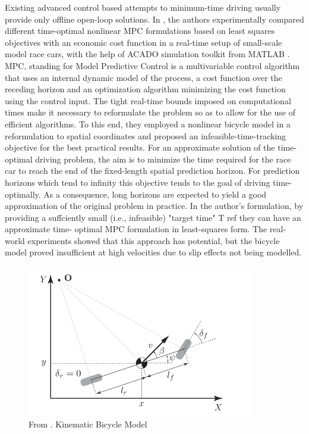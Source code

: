 Existing advanced control based attempts to minimum-time driving usually provide only offline open-loop solutions.
In \cite{mpc}, the authors experimentally compared different time-optimal nonlinear MPC \cite{mpc_orig} formulations based on least squares objectives with an economic cost function in a real-time setup of small-scale model race cars, with the help of ACADO simulation toolkit from MATLAB \cite{acado}.
MPC, standing for Model Predictive Control is a multivariable control algorithm that uses an internal dynamic model of the process, a cost function over the receding horizon and an optimization algorithm minimizing the cost function using the control input.
The tight real-time bounds imposed on computational times make it necessary to reformulate the problem so as to allow for the use of efficient algorithms. To this end, they employed a nonlinear bicycle model \cite{bycicle} in a reformulation to spatial coordinates and proposed an infeasible-time-tracking objective for the best practical results.
For an approximate solution of the time-optimal driving problem, the aim is to minimize the time required for the race car to reach the end of the fixed-length spatial prediction horizon. For prediction horizons which tend to infinity this objective tends to the goal of driving time-optimally. As a consequence, long horizons are expected to yield a good approximation of the original problem in practice.
In the author's formulation, by providing a suffciently small (i.e., infeasible) "target time" T ref they can have an approximate time-
optimal MPC formulation in least-squares form. 
The real-world experiments showed that this approach has potential, but the bicycle model proved insufficient at high velocities due to slip effects not being modelled.
\begin{figure}
 \centering
  \captionsetup{width=10cm}
  \includegraphics[width=10cm]{./img/bycicle}
  \caption{From \cite{mpc}. Kinematic Bicycle Model}
\end{figure}
